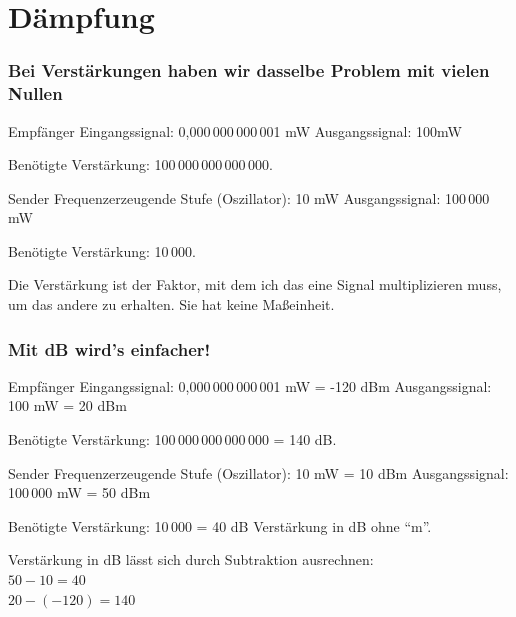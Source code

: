 \begin{frame}

\end{frame}

\section*{Dämpfung}

\begin{frame}
  \frametitle{Bei Verstärkungen haben wir dasselbe Problem mit vielen Nullen}

  \begin{block}{Empfänger}
    Eingangssignal: 0,000\,000\,000\,001 mW
    Ausgangssignal: 100mW

    Benötigte Verstärkung: 100\,000\,000\,000\,000.
  \end{block}

  \begin{block}{Sender}
    Frequenzerzeugende Stufe (Oszillator): 10 mW
    Ausgangssignal: 100\,000 mW

    Benötigte Verstärkung: 10\,000.
  \end{block}

  Die Verstärkung ist der Faktor, mit dem ich das eine Signal multiplizieren muss, um das andere zu erhalten. Sie hat keine Maßeinheit.
\end{frame}

\begin{frame}
  \frametitle{Mit dB wird's einfacher!}

  \begin{block}{Empfänger}
    Eingangssignal: 0,000\,000\,000\,001 mW = -120 dBm
    Ausgangssignal: 100 mW = 20 dBm

    Benötigte Verstärkung: 100\,000\,000\,000\,000 = 140 dB.
  \end{block}

  \begin{block}{Sender}
    Frequenzerzeugende Stufe (Oszillator): 10 mW = 10 dBm
    Ausgangssignal: 100\,000 mW = 50 dBm

    Benötigte Verstärkung: 10\,000 = 40 dB
    Verstärkung in dB ohne ``m''.
  \end{block}

  Verstärkung in dB lässt sich durch Subtraktion ausrechnen:\\
  $50 - 10 = 40$\\
  $20 - (-120) = 140$
\end{frame}

